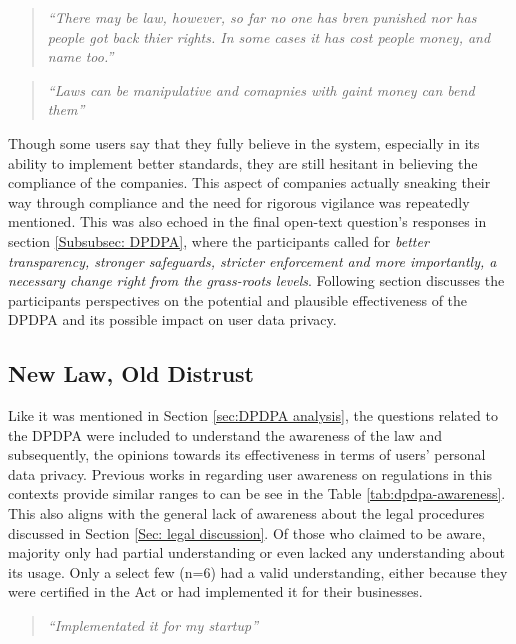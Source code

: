 \begin{quote}
   \textit{``There may be law, however, so far no one has bren punished nor has people got back thier rights. In some cases it has cost people money, and name too.''}
\end{quote}
\begin{quote}
    \textit{``Laws can be manipulative and comapnies with gaint money can bend them''}
\end{quote}

Though some users say that they fully believe in the system, especially in its ability to implement better standards, they are still hesitant in believing the compliance of the companies. This aspect of companies actually sneaking their way through compliance and the need for rigorous vigilance was repeatedly mentioned. This was also echoed in the final open-text question's responses in section \ref{Subsubsec: DPDPA}, where the participants called for \textit{better transparency, stronger safeguards, stricter enforcement and more importantly, a necessary change right from the grass-roots levels}. Following section discusses the participants perspectives on the potential and plausible effectiveness of the DPDPA and its possible impact on user data privacy.

\subsection{New Law, Old Distrust} \label{DPDPA discussion} 

Like it was mentioned in Section \ref{sec:DPDPA analysis}, the questions related to the DPDPA were included to understand the awareness of the law and subsequently, the opinions towards its effectiveness in terms of users' personal data privacy. Previous works \cite{athar2026, priyadarsini_web_2025} in  regarding user awareness on regulations in this contexts provide similar ranges to can be see in the Table \ref{tab:dpdpa-awareness}. This also aligns with the general lack of awareness about the legal procedures discussed in Section \ref{Sec: legal discussion}. Of those who claimed to be aware, majority only had partial understanding or even lacked any understanding about its usage. Only a select few (n=6) had a valid understanding, either because they were certified in the Act or had implemented it for their businesses.

\begin{quote}
   \textit{``Implementated it for my startup''}
\end{quote}

